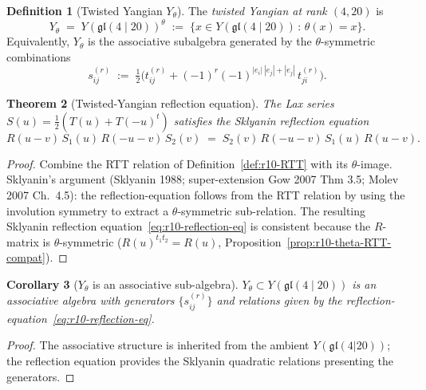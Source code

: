 \documentclass{article}
\providecommand{\fgl}{\mathfrak{gl}}
\newtheorem{theorem}{Theorem}
\newtheorem{corollary}[theorem]{Corollary}
\theoremstyle{definition}
\newtheorem{definition}[theorem]{Definition}
\begin{document}
\begin{definition}[Twisted Yangian $Y_\theta$]
\label{def:r10-Y-theta}
The \emph{twisted Yangian at rank $(4, 20)$} is
\begin{equation}\label{eq:r10-Y-theta}
  Y_\theta
  \;=\;
  Y(\fgl(4 \mid 20))^\theta
  \;:=\;
  \bigl\{ x \in Y(\fgl(4 \mid 20)) \,:\, \theta(x) = x \bigr\}.
\end{equation}
Equivalently, $Y_\theta$ is the associative subalgebra generated by
the $\theta$-symmetric combinations
\begin{equation}\label{eq:r10-theta-symmetric-generators}
  s^{(r)}_{ij}
  \;:=\;
  \tfrac{1}{2}\bigl( t^{(r)}_{ij} + (-1)^{r}
  (-1)^{|e_i|\,|e_j| + |e_j|}\, t^{(r)}_{ji} \bigr).
\end{equation}
\end{definition}

\begin{theorem}[Twisted-Yangian reflection equation]
\label{thm:r10-reflection-eq}
The Lax series $S(u) = \tfrac{1}{2}(T(u) + T(-u)^{t})$ satisfies the
Sklyanin reflection equation
\begin{equation}\label{eq:r10-reflection-eq}
  R(u - v)\, S_1(u)\, R(-u - v)\, S_2(v)
  \;=\;
  S_2(v)\, R(-u - v)\, S_1(u)\, R(u - v).
\end{equation}
\end{theorem}

\begin{proof}
Combine the RTT relation of Definition~\ref{def:r10-RTT} with its
$\theta$-image. Sklyanin's argument (Sklyanin 1988; super-extension
Gow 2007 Thm 3.5; Molev 2007 Ch.~4.5): the reflection-equation
follows from the RTT relation by using the involution symmetry to
extract a $\theta$-symmetric sub-relation. The resulting Sklyanin
reflection equation~\eqref{eq:r10-reflection-eq} is consistent
because the $R$-matrix is $\theta$-symmetric ($R(u)^{t_1 t_2} =
R(u)$, Proposition~\ref{prop:r10-theta-RTT-compat}).
\end{proof}

\begin{corollary}[$Y_\theta$ is an associative sub-algebra]
\label{cor:r10-Y-theta-associative}
$Y_\theta \subset Y(\fgl(4 \mid 20))$ is an associative algebra with
generators $\{s^{(r)}_{ij}\}$ and relations given by the
reflection-equation~\eqref{eq:r10-reflection-eq}.
\end{corollary}

\begin{proof}
The associative structure is inherited from the ambient
$Y(\fgl(4|20))$; the reflection equation provides the Sklyanin
quadratic relations presenting the generators.
\end{proof}
\end{document}
